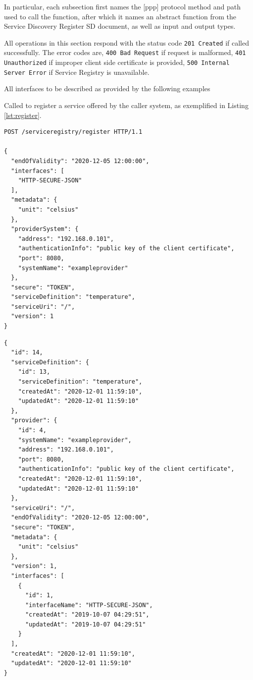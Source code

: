 \documentclass[a4paper]{arrowhead}
\newcommand{\oref}[1]{{\textcolor{ArrowheadBlue}{\hyperref[sec:operations:#1]{#1}}}}
\newcommand{\pref}[1]{{\textcolor{ArrowheadGrey}{\hyperref[sec:model:primitives:#1]{#1}}}}
\begin{document}
In particular, each subsection first names the [ppp] protocol method and path used to call the function, after which it names an abstract function from the Service Discovery Register SD document, as well as input and output types.

All operations in this section respond with the status code \texttt{201
  Created} if called successfully. The error codes are, \texttt{400
  Bad Request} if request is malformed, \texttt{401 Unauthorized} if
improper client side certificate is provided, \texttt{500 Internal
  Server Error} if Service Registry is unavailable.

\color{red}
All interfaces to be described as provided by the following examples

Called to register a service offered by the caller system, as exemplified in Listing \ref{lst:register}.

\begin{lstlisting}[language=http,label={lst:register},caption={A \oref{Register} invocation.}]
POST /serviceregistry/register HTTP/1.1

{
  "endOfValidity": "2020-12-05 12:00:00",
  "interfaces": [
    "HTTP-SECURE-JSON"
  ],
  "metadata": {
    "unit": "celsius"
  },
  "providerSystem": {
    "address": "192.168.0.101",
    "authenticationInfo": "public key of the client certificate",
    "port": 8080,
    "systemName": "exampleprovider"
  },
  "secure": "TOKEN",
  "serviceDefinition": "temperature",
  "serviceUri": "/",
  "version": 1
}
\end{lstlisting}

\begin{lstlisting}[language=http,label={lst:register_response},caption={A \oref{Register} response. Every \pref{Object} contains an id.}]
{
  "id": 14,
  "serviceDefinition": {
    "id": 13,
    "serviceDefinition": "temperature",
    "createdAt": "2020-12-01 11:59:10",
    "updatedAt": "2020-12-01 11:59:10"
  },
  "provider": {
    "id": 4,
    "systemName": "exampleprovider",
    "address": "192.168.0.101",
    "port": 8080,
    "authenticationInfo": "public key of the client certificate",
    "createdAt": "2020-12-01 11:59:10",
    "updatedAt": "2020-12-01 11:59:10"
  },
  "serviceUri": "/",
  "endOfValidity": "2020-12-05 12:00:00",
  "secure": "TOKEN",
  "metadata": {
    "unit": "celsius"
  },
  "version": 1,
  "interfaces": [
    {
      "id": 1,
      "interfaceName": "HTTP-SECURE-JSON",
      "createdAt": "2019-10-07 04:29:51",
      "updatedAt": "2019-10-07 04:29:51"
    }
  ],
  "createdAt": "2020-12-01 11:59:10",
  "updatedAt": "2020-12-01 11:59:10"
}
\end{lstlisting}
\end{document}
